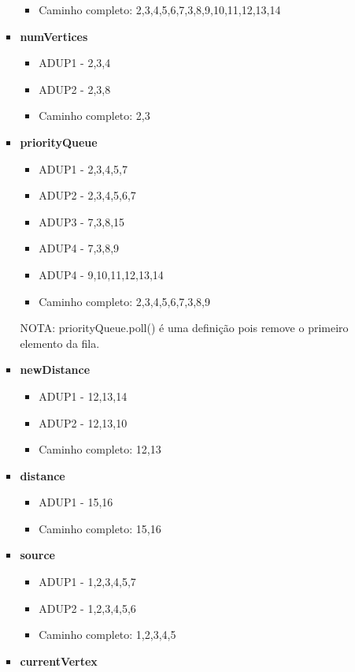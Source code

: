\documentclass{article}
\begin{document}
\begin{itemize}
\begin{enumerate}
\begin{itemize}
\begin{itemize}
            \item Caminho completo: 2,3,4,5,6,7,3,8,9,10,11,12,13,14
        \end{itemize}
        \item \textbf{numVertices}
        \begin{itemize}
            \item ADUP1 - 2,3,4
            \item ADUP2 - 2,3,8
            \item Caminho completo: 2,3
        \end{itemize}
        \item \textbf{priorityQueue}
        \begin{itemize}
            \item ADUP1 - 2,3,4,5,7
            \item ADUP2 - 2,3,4,5,6,7
            \item ADUP3 - 7,3,8,15
            \item ADUP4 - 7,3,8,9
            \item ADUP4 - 9,10,11,12,13,14
            \item Caminho completo: 2,3,4,5,6,7,3,8,9
        \end{itemize}
        NOTA: priorityQueue.poll() é uma definição pois remove o primeiro elemento da fila.
        \item \textbf{newDistance}
        \begin{itemize}
            \item ADUP1 - 12,13,14
            \item ADUP2 - 12,13,10
            \item Caminho completo: 12,13
        \end{itemize}
        \item \textbf{distance}
        \begin{itemize}
            \item ADUP1 - 15,16
            \item Caminho completo: 15,16
        \end{itemize}
        \item \textbf{source}
        \begin{itemize}
            \item ADUP1 - 1,2,3,4,5,7
            \item ADUP2 - 1,2,3,4,5,6
            \item Caminho completo: 1,2,3,4,5
        \end{itemize}
        \item \textbf{currentVertex}

\end{itemize}
\end{enumerate}
\end{itemize}
\end{document}
